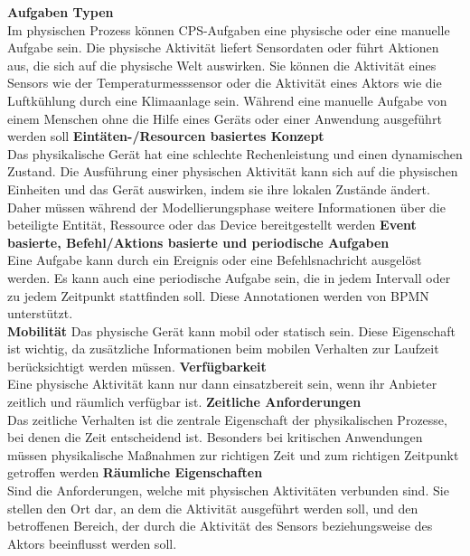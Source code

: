 \documentclass[a4paper, 12pt, twoside, headsepline=true]{scrartcl} %
\begin{document}
\textbf{Aufgaben Typen}
\\
Im physischen Prozess können CPS-Aufgaben eine physische oder eine manuelle Aufgabe sein. Die physische Aktivität liefert Sensordaten oder führt Aktionen aus, die sich auf die physische Welt auswirken. Sie können die Aktivität eines Sensors wie der Temperaturmesssensor oder die Aktivität eines Aktors wie die Luftkühlung durch eine Klimaanlage sein. Während eine manuelle Aufgabe von einem Menschen ohne die Hilfe eines Geräts oder einer Anwendung ausgeführt werden soll
\newline
\textbf{Eintäten-/Resourcen basiertes Konzept}
\\
Das physikalische Gerät hat eine schlechte Rechenleistung und einen dynamischen Zustand. Die Ausführung einer physischen Aktivität kann sich auf die physischen Einheiten und das Gerät auswirken, indem sie ihre lokalen Zustände ändert. Daher müssen während der Modellierungsphase weitere Informationen über die beteiligte Entität, Ressource oder das Device bereitgestellt werden
\newline
\textbf{Event basierte, Befehl/Aktions basierte und periodische Aufgaben}
\\
Eine Aufgabe kann durch ein Ereignis oder eine Befehlsnachricht ausgelöst werden. Es kann auch eine periodische Aufgabe sein, die in jedem Intervall oder zu jedem Zeitpunkt stattfinden soll. Diese Annotationen werden von BPMN unterstützt.
\\
\textbf{Mobilität}
\newline
Das physische Gerät kann mobil oder statisch sein. Diese Eigenschaft ist wichtig, da zusätzliche Informationen beim mobilen Verhalten zur Laufzeit berücksichtigt werden müssen.
\newline
\textbf{Verfügbarkeit}
\\
Eine physische Aktivität kann nur dann einsatzbereit sein, wenn ihr Anbieter zeitlich und räumlich verfügbar ist.
\newline
\textbf{Zeitliche Anforderungen}
\\
Das zeitliche Verhalten ist die zentrale Eigenschaft der physikalischen Prozesse, bei denen die Zeit entscheidend ist. Besonders bei kritischen Anwendungen müssen physikalische Maßnahmen zur richtigen Zeit und zum richtigen Zeitpunkt getroffen werden
\newline
\textbf{Räumliche Eigenschaften}
\\
Sind die Anforderungen, welche mit physischen Aktivitäten verbunden sind. Sie stellen den Ort dar, an dem die Aktivität ausgeführt werden soll, und den betroffenen Bereich, der durch die Aktivität des Sensors beziehungsweise des Aktors beeinflusst werden soll.
\end{document}
